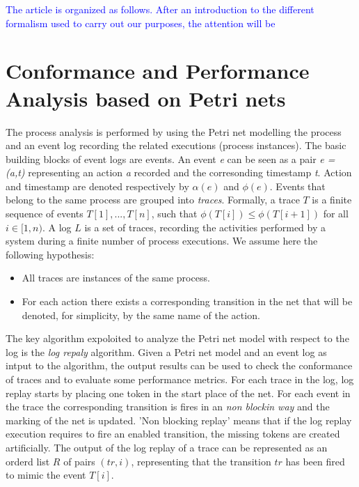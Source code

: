 \documentclass[11pt]{article}
\begin{document}
\textcolor{blue}{
The article is organized as follows. After an introduction to the different formalism used to carry out our purposes, the attention will be 
}

\section{Conformance and Performance Analysis based on Petri nets}

The process analysis is performed by using the Petri net modelling the process and an event log recording the related executions (process instances). The basic building blocks of event logs are events. An event {\itshape e} can be seen as a pair {\itshape e = (a,t) } representing an action {\itshape a } recorded and the corresonding timestamp {\itshape t}. Action and timestamp are denoted respectively by $\alpha(e)$ and $\phi(e)$. Events that belong to the same process are grouped into {\itshape traces}. Formally, a trace $T$ is a finite sequence of events $T[1],..., T[n]$, such that $\phi(T[i]) \leq \phi(T[i+1])$ for all  $i \in [1,n)$. A log $L$ is a set of traces, recording the activities performed by a system during a finite number of process executions. We assume here the following hypothesis:
\begin{itemize}
\item All traces are instances of the same process.
\item For each action there exists a corresponding transition in the net that will be denoted, for simplicity, by the same name of the action.
\end{itemize}
The key algorithm expoloited to analyze the Petri net model with respect to the log is the {\itshape log repaly} algorithm. Given a Petri net model and an event log as intput to the algorithm, the output results can be used to check the conformance of traces and to evaluate some performance metrics. For each trace in the log, log replay starts by placing one token in the start place of the net. For each event in the trace the corresponding transition is fires in an {\itshape non blockin way} and the marking of the net is updated. 'Non blocking replay' means that if the log replay execution requires to fire an enabled transition, the missing tokens are created artificially. The output of the log replay of a trace can be represented as an orderd list $R$ of pairs $(tr, i)$, representing that the transition $tr$ has been fired to mimic the event $T[i]$.
\\
\end{document}
